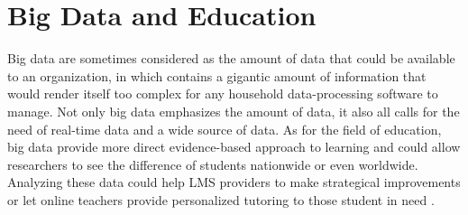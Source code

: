 \documentclass[sigconf]{acmart}
\begin{document}
\section{Big Data and Education}
Big data are sometimes considered as the amount of data that could be available to an organization, in which contains a gigantic amount of information that would render itself too complex for any household data-processing software to manage. Not only big data emphasizes the amount of data, it also all calls for the need of real-time data and a wide source of data. As for the field of education, big data provide more direct evidence-based approach to learning and could allow researchers to see the difference of students nationwide or even worldwide. Analyzing these data could help LMS providers to make strategical improvements or let online teachers provide personalized tutoring to those student in need \cite{Anderson2008}.
\end{document}
